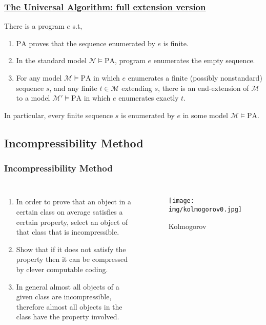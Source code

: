 \documentclass[UTF8,aspectratio=43,11pt,colorlinks,compress,openany]{beamer}%
\begin{document}
\begin{frame}\frametitle{\href{https://arxiv.org/abs/1801.04599}{The Universal Algorithm: full extension version}}
\begin{theorem}[Woodin]
There is a program $e$ s.t,
\begin{enumerate}
	\item $\mathrm{PA}$ proves that the sequence enumerated by $e$ is finite.
	\item In the standard model $\mathcal{N}\vDash\mathrm{PA}$, program $e$ enumerates the empty sequence.
	\item For any model $\mathcal{M}\vDash\mathrm{PA}$ in which $e$ enumerates a finite (possibly nonstandard) sequence $s$, and any finite $t\in\mathcal{M}$ extending $s$, there is an end-extension of $\mathcal{M}$ to a model $\mathcal{M}'\vDash\mathrm{PA}$ in which $e$ enumerates exactly $t$.
\end{enumerate}
\end{theorem}
In particular, every finite sequence $s$ is enumerated by $e$ in some model $\mathcal{M}\vDash\mathrm{PA}$.
\end{frame}

\subsection{Incompressibility Method}

\begin{frame}\frametitle{Incompressibility Method}
	\begin{columns}
			\begin{enumerate}
				\item In order to prove that an object in a certain class on average satisfies a certain property, select an object of that class that is incompressible.
				\item Show that if it does not satisfy the property then it can be compressed by clever computable coding.
				\item In general almost all objects of a given class are incompressible, therefore almost all objects in the class have the property involved.
			\end{enumerate}
			\begin{figure}
				\texttt{[image: img/kolmogorov0.jpg]}\caption{Kolmogorov}
			\end{figure}
	\end{columns}
\end{frame}
\end{document}
